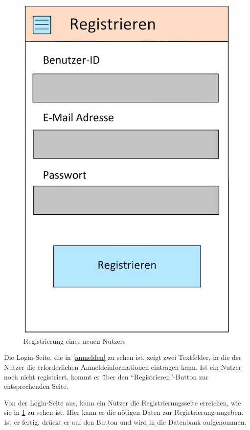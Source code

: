 \begin{figure}[H]
\begin{minipage}[c]{.5\textwidth}
			\includegraphics[width=\textwidth]{gui/registrieren.png}				
		\caption{Registrierung eines neuen Nutzers}
		\label{registrieren}
	\end{minipage}
\end{figure}

Die Login-Seite, die in \ref{anmelden} zu sehen ist, zeigt zwei Textfelder, in die der Nutzer die erforderlichen Anmeldeinformationen eintragen kann. Ist ein Nutzer noch nicht registriert, kommt er über den "`Registrieren"'-Button zur entsprechenden Seite.

Von der Login-Seite aus, kann ein Nutzer die Registrierungsseite erreichen, wie sie in \ref{registrieren} zu sehen ist. Hier kann er die nötigen Daten zur Registrierung angeben. Ist er fertig, drückt er auf den Button und wird in die Datenbank aufgenommen.



